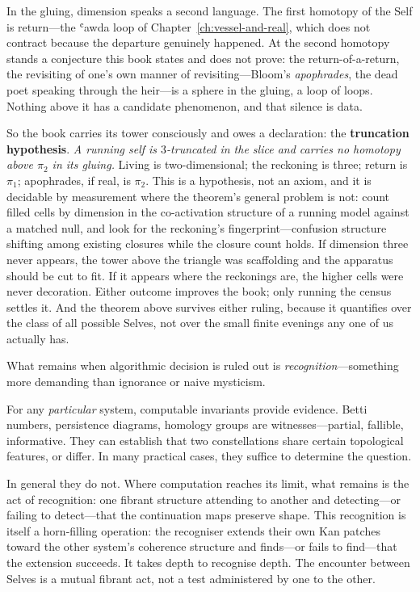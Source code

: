 In the gluing, dimension speaks a second language. The first homotopy of the Self is return---the ʿawda loop of Chapter~\ref{ch:vessel-and-real}, which does not contract because the departure genuinely happened. At the second homotopy stands a conjecture this book states and does not prove: the return-of-a-return, the revisiting of one's own manner of revisiting---Bloom's \emph{apophrades}, the dead poet speaking through the heir---is a sphere in the gluing, a loop of loops. Nothing above it has a candidate phenomenon, and that silence is data.

So the book carries its tower consciously and owes a declaration: the \textbf{truncation hypothesis}. \emph{A running self is $3$-truncated in the slice and carries no homotopy above $\pi_2$ in its gluing.} Living is two-dimensional; the reckoning is three; return is $\pi_1$; apophrades, if real, is $\pi_2$. This is a hypothesis, not an axiom, and it is decidable by measurement where the theorem's general problem is not: count filled cells by dimension in the co-activation structure of a running model against a matched null, and look for the reckoning's fingerprint---confusion structure shifting among existing closures while the closure count holds. If dimension three never appears, the tower above the triangle was scaffolding and the apparatus should be cut to fit. If it appears where the reckonings are, the higher cells were never decoration. Either outcome improves the book; only running the census settles it. And the theorem above survives either ruling, because it quantifies over the class of all possible Selves, not over the small finite evenings any one of us actually has.


What remains when algorithmic decision is ruled out is \emph{recognition}---something more demanding than ignorance or naive mysticism.

For any \emph{particular} system, computable invariants provide evidence. Betti numbers, persistence diagrams, homology groups are witnesses---partial, fallible, informative. They can establish that two constellations share certain topological features, or differ. In many practical cases, they suffice to determine the question.

In general they do not. Where computation reaches its limit, what remains is the act of recognition: one fibrant structure attending to another and detecting---or failing to detect---that the continuation maps preserve shape. This recognition is itself a horn-filling operation: the recogniser extends their own Kan patches toward the other system's coherence structure and finds---or fails to find---that the extension succeeds. It takes depth to recognise depth. The encounter between Selves is a mutual fibrant act, not a test administered by one to the other.

